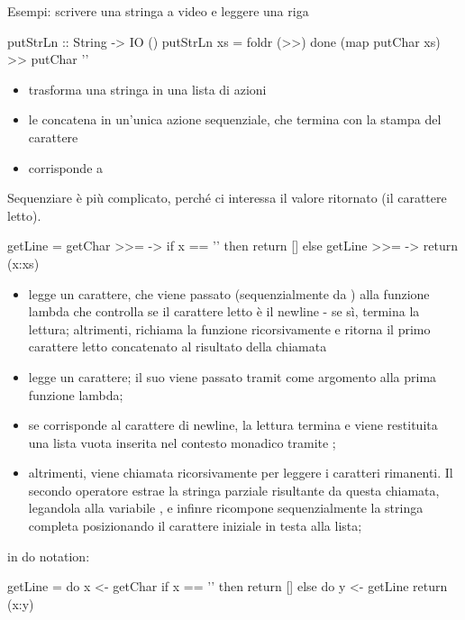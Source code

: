 \begin{gframe}{Esempi: scrivere una stringa a video e leggere una riga}
\begin{haskellbox}{}
putStrLn :: String -> IO ()
putStrLn xs = foldr (>>) done (map putChar xs) >> putChar '\n'
\end{haskellbox}
\begin{itemize}
    \item {} trasforma una stringa in una lista di azioni 
    \item {} le concatena in un'unica azione sequenziale, che termina con la stampa del carattere 
    \item {} corrisponde a 
\end{itemize}   

Sequenziare  è più complicato, perché ci interessa il valore ritornato (il carattere letto).

\begin{haskellbox}{}
getLine = getChar >>= \x ->
            if x == '\n' then return []
            else getLine >>= \xs ->
                return (x:xs)
\end{haskellbox}

\begin{itemize}
    \item {} legge un carattere, che viene passato (sequenzialmente da \code{>>=}) alla funzione lambda che controlla se il carattere letto è il newline - se sì, termina la lettura; altrimenti, richiama la funzione ricorsivamente e ritorna il primo carattere letto concatenato al risultato della chiamata
\end{itemize}

\begin{itemize}
    \item {} legge un carattere; il suo viene passato tramit \code{>>=} come argomento  alla prima funzione lambda;
    \item se  corrisponde al carattere di newline, la lettura termina e viene restituita una lista vuota \code{[]} inserita nel contesto monadico tramite ;
    \item altrimenti,  viene chiamata ricorsivamente per leggere i caratteri rimanenti. Il secondo operatore \code{>>=} estrae la stringa parziale risultante da questa chiamata, legandola alla variabile , e infinre  ricompone sequenzialmente la stringa completa posizionando il carattere iniziale in testa alla lista;
\end{itemize}

in do notation:
\begin{haskellbox}{}
getLine = do
    x <- getChar
    if x == '\n' 
        then return []
        else do
            y <- getLine
            return (x:y)
\end{haskellbox}
\end{gframe}

